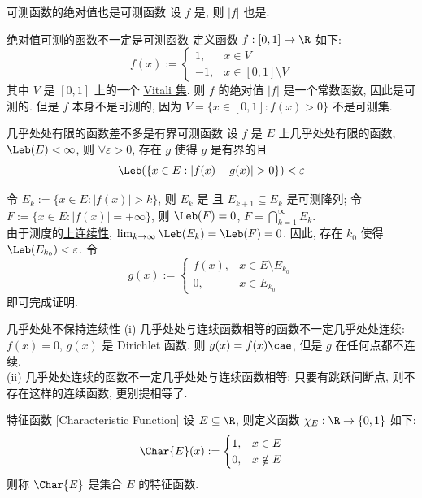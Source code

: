 \begin{ppt}
    {可测函数的绝对值也是可测函数}
    设 \(f\) 是\MeasurableFunc{}, 则 \(|f|\) 也是\MeasurableFunc{}.
\end{ppt}
\begin{cxmp}
    {绝对值可测的函数不一定是可测函数}
    定义函数 \(f:[0,1]\to\R\) 如下:
    \[f(x):=\begin{cases}
    1, & x\in V\\
    -1, & x\in [0,1]\setminus V
    \end{cases}\]
    其中 \(V\) 是 \([0,1]\) 上的一个 \hyperref[thm:vitali-set]{Vitali 集}. 则 \(f\) 的绝对值 \(|f|\) 是一个常数函数, 因此是可测的. 但是 \(f\) 本身不是可测的, 因为 \(V=\{x\in[0,1]: f(x)>0\}\) 不是可测集.
\end{cxmp}
\begin{thm}
    {几乎处处有限的函数差不多是有界可测函数}
    设 \(f\) 是 \(E\) 上几乎处处有限的函数, \(\Leb(E)<\infty\), 则 \(\forall\varepsilon>0\), 存在\MeasurableFunc{} \(g\) 使得 \(g\) 是有界的且
    \[\Leb(\{x\in E: |f(x)- g(x)|>0\})<\varepsilon\]
\end{thm}
\begin{prf}
    令 \(E_k:=\{x\in E: |f(x)|> k\}\), 则 \(E_k\) 是\MeasurableSet{} 且 \(E_{k+1}\subseteq E_k\) 是可测降列; 令 \(F:=\{x\in E: |f(x)|=+\infty\}\), 则 \(\Leb(F)=0\), \(F=\bigcap_{k=1}^\infty E_k\).\\
    由于测度的\hyperref[ppt:measure-continuity-above]{上连续性}, \(\lim_{k\to\infty} \Leb(E_k)=\Leb(F)=0\). 因此, 存在 \(k_0\) 使得 \(\Leb(E_{k_0})<\varepsilon\). 令 
    \[g(x):=\begin{cases}
    f(x), & x\in E\setminus E_{k_0}\\
    0, & x\in E_{k_0}
    \end{cases}\] 
    即可完成证明.
\end{prf}
\begin{cxmp}
    {几乎处处不保持连续性}
    (i) 几乎处处与连续函数相等的函数不一定几乎处处连续: \(f(x)=0\), \(g(x)\) 是 Dirichlet 函数. 则 \(g(x)=f(x) \cae\), 但是 \(g\) 在任何点都不连续.\\
    (ii) 几乎处处连续的函数不一定几乎处处与连续函数相等: 只要有跳跃间断点, 则不存在这样的连续函数, 更别提相等了.
\end{cxmp}
\begin{dfn}
    {特征函数}
    [Characteristic Function]
    设 \(E\subseteq\R\), 则定义函数 \(\chi_E:\R\to\{0,1\}\) 如下:
    \[\Char{E}(x):=\begin{cases}
    1, & x\in E\\
    0, & x\notin E
    \end{cases}\]
    则称 \(\Char{E}\) 是集合 \(E\) 的特征函数.
\end{dfn}
